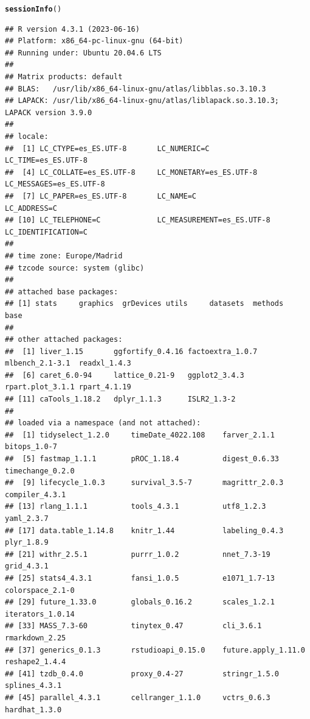 \documentclass{article}\usepackage[]{graphicx}\usepackage[]{xcolor}
\makeatletter
\newcommand{\hlstd}[1]{\textcolor[rgb]{0.345,0.345,0.345}{#1}}%
\newcommand{\hlkwd}[1]{\textcolor[rgb]{0.737,0.353,0.396}{\textbf{#1}}}%
\newenvironment{kframe}{%
 \def\at@end@of@kframe{}%
 \ifinner\ifhmode%
  \def\at@end@of@kframe{\end{minipage}}%
  \begin{minipage}{\columnwidth}%
 \fi\fi%
 \def\FrameCommand##1{\hskip\@totalleftmargin \hskip-\fboxsep
 \colorbox{shadecolor}{##1}\hskip-\fboxsep
     \hskip-\linewidth \hskip-\@totalleftmargin \hskip\columnwidth}%
 \MakeFramed {\advance\hsize-\width
   \@totalleftmargin\z@ \linewidth\hsize
   \@setminipage}}%
 {\par\unskip\endMakeFramed%
 \at@end@of@kframe}
\newenvironment{knitrout}{}{} %
\makeatother
\begin{document}
\begin{knitrout}
\color{fgcolor}\begin{kframe}
\begin{alltt}
\hlkwd{sessionInfo}\hlstd{()}
\end{alltt}
\begin{verbatim}
## R version 4.3.1 (2023-06-16)
## Platform: x86_64-pc-linux-gnu (64-bit)
## Running under: Ubuntu 20.04.6 LTS
## 
## Matrix products: default
## BLAS:   /usr/lib/x86_64-linux-gnu/atlas/libblas.so.3.10.3 
## LAPACK: /usr/lib/x86_64-linux-gnu/atlas/liblapack.so.3.10.3;  LAPACK version 3.9.0
## 
## locale:
##  [1] LC_CTYPE=es_ES.UTF-8       LC_NUMERIC=C               LC_TIME=es_ES.UTF-8       
##  [4] LC_COLLATE=es_ES.UTF-8     LC_MONETARY=es_ES.UTF-8    LC_MESSAGES=es_ES.UTF-8   
##  [7] LC_PAPER=es_ES.UTF-8       LC_NAME=C                  LC_ADDRESS=C              
## [10] LC_TELEPHONE=C             LC_MEASUREMENT=es_ES.UTF-8 LC_IDENTIFICATION=C       
## 
## time zone: Europe/Madrid
## tzcode source: system (glibc)
## 
## attached base packages:
## [1] stats     graphics  grDevices utils     datasets  methods   base     
## 
## other attached packages:
##  [1] liver_1.15       ggfortify_0.4.16 factoextra_1.0.7 mlbench_2.1-3.1  readxl_1.4.3    
##  [6] caret_6.0-94     lattice_0.21-9   ggplot2_3.4.3    rpart.plot_3.1.1 rpart_4.1.19    
## [11] caTools_1.18.2   dplyr_1.1.3      ISLR2_1.3-2     
## 
## loaded via a namespace (and not attached):
##  [1] tidyselect_1.2.0     timeDate_4022.108    farver_2.1.1         bitops_1.0-7        
##  [5] fastmap_1.1.1        pROC_1.18.4          digest_0.6.33        timechange_0.2.0    
##  [9] lifecycle_1.0.3      survival_3.5-7       magrittr_2.0.3       compiler_4.3.1      
## [13] rlang_1.1.1          tools_4.3.1          utf8_1.2.3           yaml_2.3.7          
## [17] data.table_1.14.8    knitr_1.44           labeling_0.4.3       plyr_1.8.9          
## [21] withr_2.5.1          purrr_1.0.2          nnet_7.3-19          grid_4.3.1          
## [25] stats4_4.3.1         fansi_1.0.5          e1071_1.7-13         colorspace_2.1-0    
## [29] future_1.33.0        globals_0.16.2       scales_1.2.1         iterators_1.0.14    
## [33] MASS_7.3-60          tinytex_0.47         cli_3.6.1            rmarkdown_2.25      
## [37] generics_0.1.3       rstudioapi_0.15.0    future.apply_1.11.0  reshape2_1.4.4      
## [41] tzdb_0.4.0           proxy_0.4-27         stringr_1.5.0        splines_4.3.1       
## [45] parallel_4.3.1       cellranger_1.1.0     vctrs_0.6.3          hardhat_1.3.0       

\end{verbatim}
\end{kframe}
\end{knitrout}
\end{document}
